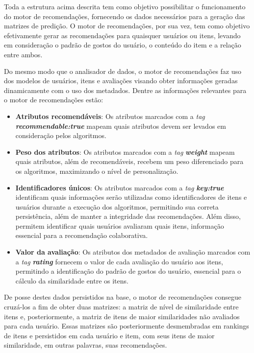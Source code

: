 \documentclass[12pt, openright, oneside, a4paper, brazil]{abntex2}
\begin{document}
Toda a estrutura acima descrita tem como objetivo possibilitar o funcionamento do motor de recomendações, fornecendo os dados necessários para a geração das matrizes de predição. O motor de recomendações, por sua vez, tem como objetivo efetivamente gerar as recomendações para quaisquer usuários ou itens, levando em consideração o padrão de gostos do usuário, o conteúdo do item e a relação entre ambos.

Do mesmo modo que o analisador de dados, o motor de recomendações faz uso dos modelos de usuários, itens e avaliações visando obter informações geradas dinamicamente com o uso dos metadados. Dentre as informações relevantes para o motor de recomendações estão:

\begin{itemize}
	\item \textbf{Atributos recomendáveis}: Os atributos marcados com a \textit{tag} \textbf{\textit{recommendable:true}} mapeam quais atributos devem ser levados em consideração pelos algoritmos.

	\item \textbf{Peso dos atributos}: Os atributos marcados com a \textit{tag} \textbf{\textit{weight}} mapeam quais atributos, além de recomendáveis, recebem um peso diferenciado para os algoritmos, maximizando o nível de personalização.

	\item \textbf{Identificadores únicos}: Os atributos marcados com a \textit{tag} \textbf{\textit{key:true}} identificam quais informações serão utilizadas como identificadores de itens e usuários durante a execução dos algoritmos, permitindo sua correta persistência, além de manter a integridade das recomendações. Além disso, permitem identificar quais usuários avaliaram quais itens, informação essencial para a recomendação colaborativa.

	\item \textbf{Valor da avaliação}: Os atributos dos metadados de avaliação marcados com a \textit{tag} \textbf{\textit{rating}} fornecem o valor de cada avaliação do usuário aos itens, permitindo a identificação do padrão de gostos do usuário, essencial para o cálculo da similaridade entre os itens.
\end{itemize}

De posse destes dados persistidos na base, o motor de recomendações consegue cruzá-los a fim de obter duas matrizes: a matriz de nível de similaridade entre itens e, posteriormente, a matriz de itens de maior similaridades não avaliados para cada usuário. Essas matrizes são posteriormente desmembradas em rankings de itens e persistidos em cada usuário e item, com seus itens de maior similaridade, em outras palavras, suas recomendações.
\end{document}
